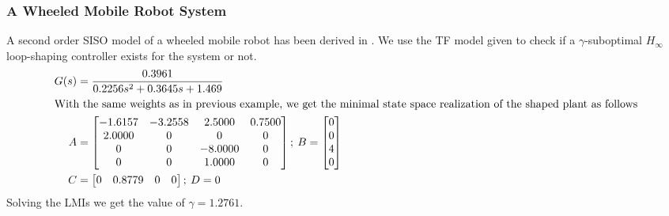 \documentclass[a4paper,12pt]{article}
\begin{document}
	 \subsubsection{A Wheeled Mobile Robot System}
	 A second order SISO model of a wheeled mobile robot has been derived in \cite{robot}. We use the TF model given to check if a $\gamma$-suboptimal $H_{\infty}$ loop-shaping controller exists for the system or not. 
	 \begin{align}
	 G(s)&=\frac{0.3961}{0.2256s^{2} + 0.3645s + 1.469} \\
	 \intertext{With the same weights as in previous example, we get the minimal state space realization of the shaped plant as follows}
	 A &=
\begin{bmatrix}
   -1.6157  & -3.2558  &  2.5000   & 0.7500 \\
    2.0000     &    0   &      0    &     0\\
         0    &     0  & -8.0000   &      0\\
         0   &      0  &  1.0000  &       0
\end{bmatrix}; \:
B =
\begin{bmatrix}
     0\\
     0\\
     4\\
     0
\end{bmatrix}\\
C &=
\begin{bmatrix}
         0  &  0.8779       &  0       &  0
\end{bmatrix}; \:
D =     0
     \end{align}
     Solving the LMIs we get the value of $\gamma=1.2761$. 
\end{document}
